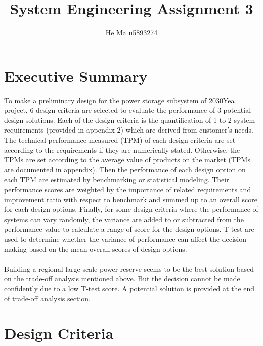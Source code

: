 \documentclass{article}
\date{}
\author{He Ma u5893274}
\begin{document}
\title{\vspace{-1cm}System Engineering Assignment 3}
\maketitle
\section{Executive Summary}
To make a preliminary design for the power storage subsystem of 2030Yea project, 6 design criteria are selected to evaluate the performance of 3 potential design solutions. Each of the design criteria is the quantification of 1 to 2 system requirements (provided in appendix 2) which are derived from customer's needs. The technical performance measured (TPM) of each design criteria are set according to the requirements if they are numerically stated. Otherwise, the TPMs are set according to the average value of products on the market (TPMs are documented in appendix). Then the performance of each design option on each TPM are estimated by benchmarking or statistical modeling. Their performance scores are weighted by the importance of related requirements and improvement ratio with respect to benchmark and summed up to an overall score for each design options. Finally, for some design criteria where the performance of systems can vary randomly, the variance are added to or subtracted from the performance value to calculate a range of score for the design options. T-test are used to determine whether the variance of performance can  affect the decision making based on the mean overall scores of design options.\\
\\
Building a regional large scale power reserve seems to be the best solution based on the trade-off analysis mentioned above. But the decision cannot be made confidently due to a low T-test score. A potential solution is provided at the end of trade-off analysis section.
\section{Design Criteria}
\end{document}
